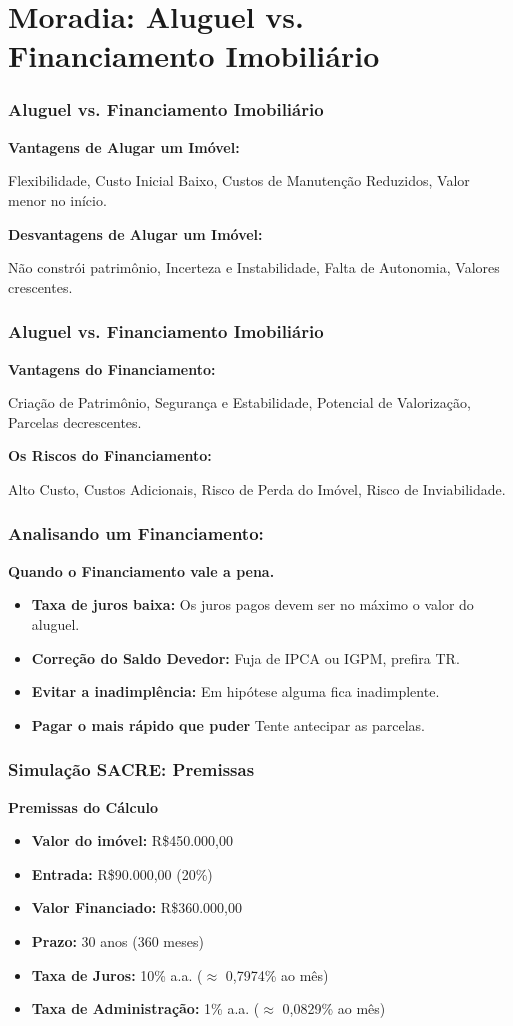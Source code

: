 \section{Moradia: Aluguel vs. Financiamento Imobiliário}

\begin{frame}[c]\frametitle{Aluguel vs. Financiamento Imobiliário}
  \textbf{Vantagens de Alugar um Imóvel:}

  Flexibilidade, Custo Inicial Baixo, Custos de Manutenção Reduzidos, Valor menor no início.

  \vfill

  \textbf{Desvantagens de Alugar um Imóvel:}

  Não constrói patrimônio, Incerteza e Instabilidade, Falta de Autonomia, Valores crescentes.
\end{frame}

\begin{frame}[c]\frametitle{Aluguel vs. Financiamento Imobiliário}
  \textbf{Vantagens do Financiamento:}

  Criação de  Patrimônio, Segurança e Estabilidade, Potencial de Valorização, Parcelas decrescentes.

  \vfill

  \textbf{Os Riscos do Financiamento:}

  Alto Custo, Custos Adicionais, Risco de Perda do Imóvel, Risco de Inviabilidade.
\end{frame}

\begin{frame}[c]\frametitle{Analisando um Financiamento:}
  \textbf{Quando o Financiamento vale a pena.}
  \begin{itemize}
    \item \textbf{Taxa de juros baixa:} Os juros pagos devem ser no máximo o valor do aluguel.
    \item \textbf{Correção do Saldo Devedor:} Fuja de IPCA ou IGPM, prefira TR.
    \item \textbf{Evitar a inadimplência:} Em hipótese alguma fica inadimplente.
    \item \textbf{Pagar o mais rápido que puder} Tente antecipar as parcelas.
  \end{itemize}
\end{frame}

\begin{frame}[c]\frametitle{Simulação SACRE: Premissas}
  \textbf{Premissas do Cálculo}
  \begin{itemize}
    \item \textbf{Valor do imóvel:} R\$450.000,00
    \item \textbf{Entrada:} R\$90.000,00 (20\%)
    \item \textbf{Valor Financiado:} R\$360.000,00
    \item \textbf{Prazo:} 30 anos (360 meses)
    \item \textbf{Taxa de Juros:} 10\% a.a. ($\approx$ 0,7974\% ao mês)
    \item \textbf{Taxa de Administração:} 1\% a.a. ($\approx$ 0,0829\% ao mês)
  \end{itemize}
\end{frame}

